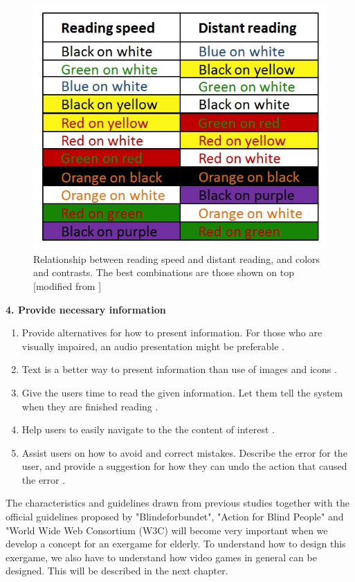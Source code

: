 \begin{figure} [ht!]
\centering
\includegraphics[scale=0.5]{readingcolors.jpg}
\caption[Colors and contrasts]{Relationship between reading speed and distant reading, and colors and contrasts. The best combinations are those shown on top [modified from \cite{blindeforbundetTekst}]}
\label{fig:colors}
\end{figure}

\textbf{4. Provide necessary information}
\begin{enumerate}[{4}.a]
\item Provide alternatives for how to present information. For those who are visually impaired, an audio presentation might be preferable \cite{blindeforbundetTekst} \cite{w3cTekst}. 
\item Text is a better way to present information than use of images and icons \cite{w3cTekst}.
\item Give the users time to read the given information. Let them tell the system when they are finished reading \cite{w3cTekst}.  
\item Help users to easily navigate to the the content of interest \cite{w3cTekst}.
\item Assist users on how to avoid and correct mistakes. Describe the error for the user, and provide a suggestion for how they can undo the action that caused the error \cite{w3cTekst}.      
\end{enumerate} 

The characteristics and guidelines drawn from previous studies together with the official guidelines proposed by "Blindeforbundet", "Action for Blind People" and "World Wide Web Consortium (W3C) will become very important  when we develop a concept for an exergame for elderly. To understand how to design this exergame, we also have to understand how video games in general can be designed. This will be described in the next chapter.




